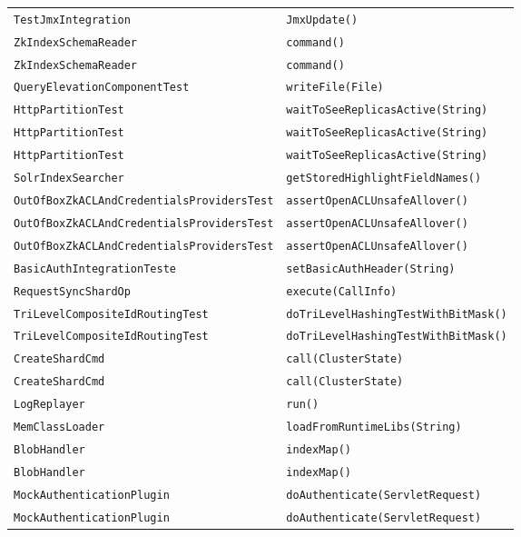 \begin{center}
\begin{longtable}{ll}
\lstinline/TestJmxIntegration/&{\lstinline/JmxUpdate()/}\\
\lstinline/ZkIndexSchemaReader/&{\lstinline/command()/}\\
\lstinline/ZkIndexSchemaReader/&{\lstinline/command()/}\\
\lstinline/QueryElevationComponentTest/&{\lstinline/writeFile(File)/}\\
\lstinline/HttpPartitionTest/&{\lstinline/waitToSeeReplicasActive(String)/}\\
\lstinline/HttpPartitionTest/&{\lstinline/waitToSeeReplicasActive(String)/}\\
\lstinline/HttpPartitionTest/&{\lstinline/waitToSeeReplicasActive(String)/}\\
\lstinline/SolrIndexSearcher/&{\lstinline/getStoredHighlightFieldNames()/}\\
\lstinline/OutOfBoxZkACLAndCredentialsProvidersTest/&{\lstinline/assertOpenACLUnsafeAllover()/}\\
\lstinline/OutOfBoxZkACLAndCredentialsProvidersTest/&{\lstinline/assertOpenACLUnsafeAllover()/}\\
\lstinline/OutOfBoxZkACLAndCredentialsProvidersTest/&{\lstinline/assertOpenACLUnsafeAllover()/}\\
\lstinline/BasicAuthIntegrationTeste/&{\lstinline/setBasicAuthHeader(String)/}\\
\lstinline/RequestSyncShardOp/&{\lstinline/execute(CallInfo)/}\\
\lstinline/TriLevelCompositeIdRoutingTest/&{\lstinline/doTriLevelHashingTestWithBitMask()/}\\
\lstinline/TriLevelCompositeIdRoutingTest/&{\lstinline/doTriLevelHashingTestWithBitMask()/}\\
\lstinline/CreateShardCmd/&{\lstinline/call(ClusterState)/}\\
\lstinline/CreateShardCmd/&{\lstinline/call(ClusterState)/}\\
\lstinline/LogReplayer/&{\lstinline/run()/}\\
\lstinline/MemClassLoader/&{\lstinline/loadFromRuntimeLibs(String)/}\\
\lstinline/BlobHandler/&{\lstinline/indexMap()/}\\
\lstinline/BlobHandler/&{\lstinline/indexMap()/}\\
\lstinline/MockAuthenticationPlugin/&{\lstinline/doAuthenticate(ServletRequest)/}\\
\lstinline/MockAuthenticationPlugin/&{\lstinline/doAuthenticate(ServletRequest)/}\\

\end{longtable}
\end{center}
